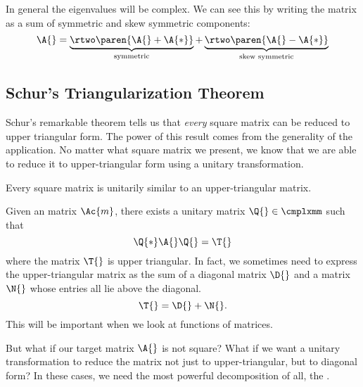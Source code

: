 In general the eigenvalues will be complex. We can see this by writing the matrix as a sum of symmetric and skew symmetric components:
\begin{equation}
  \A{} = \underbrace{\rtwo \paren{\A{} + \A{*}}}_{\text{symmetric}} + \underbrace{\rtwo \paren{\A{} - \A{*}}}_{\text{skew symmetric}}
\end{equation}

\subsection{Schur's Triangularization Theorem}
Schur's remarkable theorem tells us that \emph{every} square matrix can be reduced to upper triangular form. The power of this result comes from the generality of the application. No matter what square matrix we present, we know that we are able to reduce it to upper-triangular form using a unitary transformation. 

\begin{thm}
Every square matrix is unitarily similar to an upper-triangular matrix.
\label{thm:Schur}
\end{thm}

Given an matrix $\Ac{m}$, there exists a unitary matrix $\Q{}\in\cmplxmm$ such that
\begin{equation}
  \Q{*}\A{}\Q{} = \T{}
\end{equation}
where the matrix $\T{}$ is upper triangular. In fact, we sometimes need to express the upper-triangular matrix as the sum of a diagonal matrix $\D{}$ and a matrix $\N{}$ whose entries all lie above the diagonal.
\begin{equation}
  \T{} = \D{} + \N{}.
\end{equation} 
This will be important when we look at functions of matrices.

But what if our target matrix $\A{}$ is not square? What if we want a unitary transformation to reduce the matrix not just to upper-triangular, but to diagonal form? In these cases, we need the most powerful decomposition of all, the \svdl.

